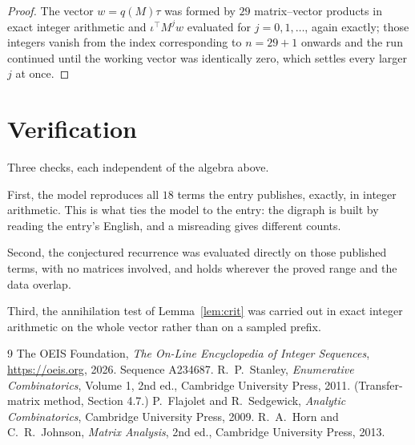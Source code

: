 \documentclass[11pt,a4paper]{article}
\theoremstyle{plain}
\theoremstyle{definition}
\begin{document}
\begin{proof}
The vector $w=q(M)\tau$ was formed by $29$ matrix--vector products in exact integer
arithmetic and $\iota^{\!\top}M^{j}w$ evaluated for $j=0,1,\dots$, again exactly; those
integers vanish from the index corresponding to $n=29+1$ onwards and the run continued
until the working vector was identically zero, which settles every larger $j$ at once.
\end{proof}

\section{Verification}

Three checks, each independent of the algebra above.

First, the model reproduces all $18$ terms the entry publishes, exactly, in integer
arithmetic. This is what ties the model to the entry: the digraph is built by reading the
entry's English, and a misreading gives different counts.

Second, the conjectured recurrence was evaluated directly on those published terms, with no
matrices involved, and holds wherever the proved range and the data overlap.

Third, the annihilation test of Lemma~\ref{lem:crit} was carried out in exact integer
arithmetic on the whole vector rather than on a sampled prefix.

\begin{thebibliography}{9}
 The OEIS Foundation, \emph{The On-Line Encyclopedia of Integer
Sequences}, \url{https://oeis.org}, 2026. Sequence A234687.
 R.~P.~Stanley, \emph{Enumerative Combinatorics}, Volume 1, 2nd ed.,
Cambridge University Press, 2011. (Transfer-matrix method, Section 4.7.)
 P.~Flajolet and R.~Sedgewick, \emph{Analytic Combinatorics}, Cambridge
University Press, 2009.
 R.~A.~Horn and C.~R.~Johnson, \emph{Matrix Analysis}, 2nd ed., Cambridge
University Press, 2013.
\end{thebibliography}
\end{document}
